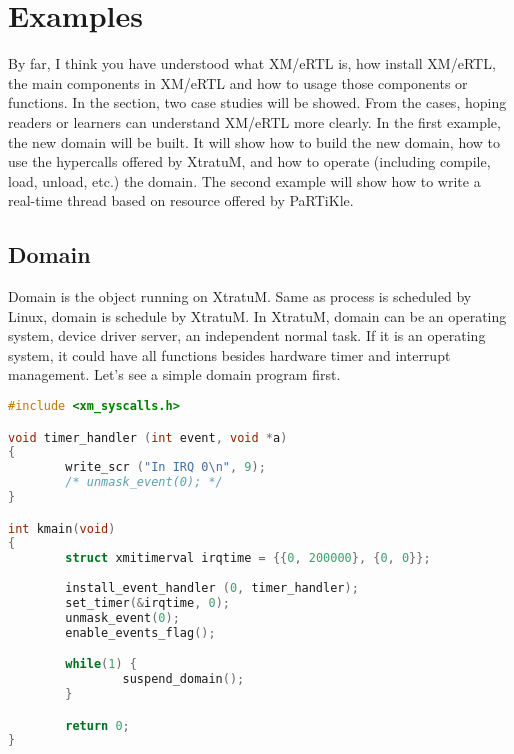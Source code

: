 \section{Examples}
By far, I think you have understood what XM/eRTL is, how install XM/eRTL, the main components in XM/eRTL and how to usage those components or functions. In the section, two case studies will be showed. From the cases, hoping readers or learners can understand XM/eRTL more clearly. In the first example, the new domain will be built. It will show how to build the new domain, how to use the hypercalls offered by XtratuM, and how to operate (including compile, load, unload, etc.) the domain. The second example will show how to write a real-time thread based on resource offered by PaRTiKle.

\subsection{Domain}
Domain is the object running on XtratuM. Same as process is scheduled by Linux, domain is schedule by XtratuM. In XtratuM, domain can be an operating system, device driver server, an independent normal task. If it is an operating system, it could have all functions besides hardware timer and interrupt management. Let's see a simple domain program first.

\begin{lstlisting}[language=c]
#include <xm_syscalls.h>

void timer_handler (int event, void *a) 
{
        write_scr ("In IRQ 0\n", 9);
        /* unmask_event(0); */
}

int kmain(void)
{
        struct xmitimerval irqtime = {{0, 200000}, {0, 0}};
	
        install_event_handler (0, timer_handler);
        set_timer(&irqtime, 0);
        unmask_event(0);
        enable_events_flag();

        while(1) {
                suspend_domain();
        }

        return 0;
}
\end{lstlisting}

